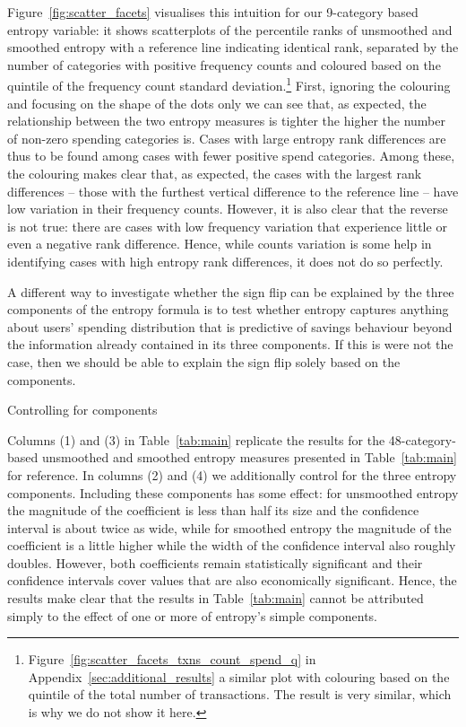 Figure~\ref{fig:scatter_facets} visualises this intuition for our 9-category
based entropy variable: it shows scatterplots of the percentile ranks of
unsmoothed and smoothed entropy with a reference line indicating identical
rank, separated by the number of categories with positive frequency counts and
coloured based on the quintile of the frequency count standard
deviation.\footnote{Figure~\ref{fig:scatter_facets_txns_count_spend_q} in
    Appendix~\ref{sec:additional_results} a similar plot with colouring based on the
quintile of the total number of transactions. The result is very similar, which
is why we do not show it here.} First, ignoring the colouring and focusing on
the shape of the dots only we can see that, as expected, the relationship
between the two entropy measures is tighter the higher the number of non-zero
spending categories is. Cases with large entropy rank differences are thus to
be found among cases with fewer positive spend categories. Among these, the
colouring makes clear that, as expected, the cases with the largest rank
differences -- those with the furthest vertical difference to the reference
line -- have low variation in their frequency counts. However, it is also clear
that the reverse is not true: there are cases with low frequency variation that
experience little or even a negative rank difference. Hence, while counts
variation is some help in identifying cases with high entropy rank differences,
it does not do so perfectly.

A different way to investigate whether the sign flip can be explained by the
three components of the entropy formula is to test whether entropy captures
anything about users' spending distribution that is predictive of savings
behaviour beyond the information already contained in its three components. If
this is were not the case, then we should be able to explain the sign flip
solely based on the components.


\begin{table}[ht]
\centering\footnotesize
\caption{Controlling for components}
\label{tab:components}

\end{table}


Columns (1) and (3) in Table~\ref{tab:main} replicate the results for the
48-category-based unsmoothed and smoothed entropy measures presented in
Table~\ref{tab:main} for reference. In columns (2) and (4) we additionally
control for the three entropy components. Including these components has some
effect: for unsmoothed entropy the magnitude of the coefficient is less than
half its size and the confidence interval is about twice as wide, while for
smoothed entropy the magnitude of the coefficient is a little higher while the
width of the confidence interval also roughly doubles.  However, both
coefficients remain statistically significant and their confidence intervals
cover values that are also economically significant.  Hence, the results make
clear that the results in Table~\ref{tab:main} cannot be attributed simply to
the effect of one or more of entropy's simple components.


